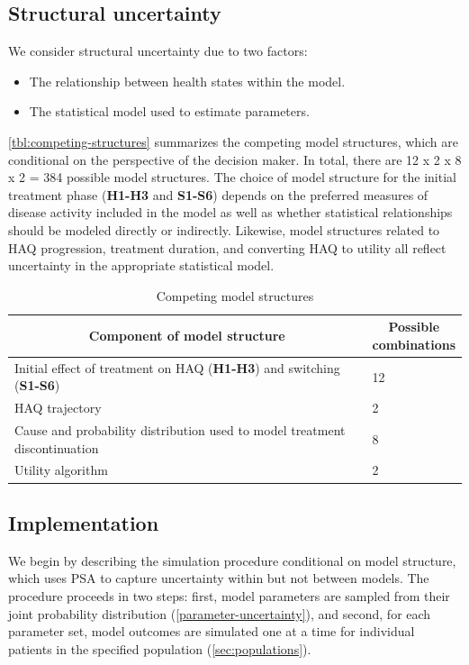 \documentclass[11pt,final,fleqn]{article}
\theoremstyle{plain}
\begin{document}
\subsection{Structural uncertainty}\label{stuctural-uncertainty}
We consider structural uncertainty due to two factors:

\begin{itemize}
\item The relationship between health states within the model.
\item The statistical model used to estimate parameters.
\end{itemize}

\autoref{tbl:competing-structures} summarizes the competing model structures, which are conditional on the perspective of the decision maker. In total, there are 12 x 2 x 8 x 2 = 384 possible model structures. The choice of model structure for the initial treatment phase (\textbf{H1-H3} and \textbf{S1-S6}) depends on the preferred measures of disease activity included in the model as well as whether statistical relationships should be modeled directly or indirectly. Likewise, model structures related to HAQ progression, treatment duration, and converting HAQ to utility all reflect uncertainty in the appropriate statistical model. 

\renewcommand{\arraystretch}{1.5}

\begin{table}[!ht]
\begin{center}
\begin{threeparttable}
\caption{Competing model structures} \label{tbl:competing-structures}
\begin{tabular}{p{0.80\linewidth}p{0.20\linewidth}}
\hline
\multicolumn{1}{c}{Component of model structure} & \multicolumn{1}{c}{Possible combinations} \\
\hline
Initial effect of treatment on HAQ (\textbf{H1-H3}) and switching (\textbf{S1-S6}) & 12  \\
HAQ trajectory & 2 \\
Cause and probability distribution used to model treatment discontinuation & 8 \\
Utility algorithm & 2 \\
\hline
\end{tabular}
\end{threeparttable}
\end{center}
\end{table}\renewcommand{\arraystretch}{1}


\subsection{Implementation}\label{implementation}
We begin by describing the simulation procedure conditional on model structure, which uses PSA to capture uncertainty within but not between models. The procedure proceeds in two steps: first, model parameters are sampled from their joint probability distribution (\autoref{parameter-uncertainty}), and second, for each parameter set, model outcomes are simulated one at a time for individual patients in the specified population (\autoref{sec:populations}).   
\end{document}
